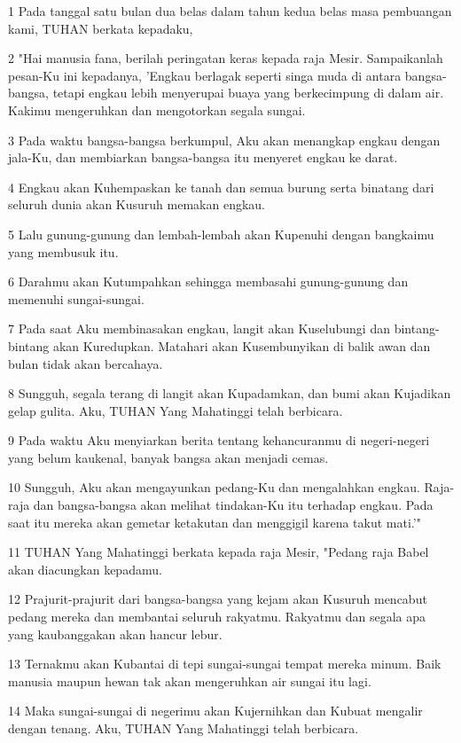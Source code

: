 \par 1 Pada tanggal satu bulan dua belas dalam tahun kedua belas masa pembuangan kami, TUHAN berkata kepadaku,
\par 2 "Hai manusia fana, berilah peringatan keras kepada raja Mesir. Sampaikanlah pesan-Ku ini kepadanya, 'Engkau berlagak seperti singa muda di antara bangsa-bangsa, tetapi engkau lebih menyerupai buaya yang berkecimpung di dalam air. Kakimu mengeruhkan dan mengotorkan segala sungai.
\par 3 Pada waktu bangsa-bangsa berkumpul, Aku akan menangkap engkau dengan jala-Ku, dan membiarkan bangsa-bangsa itu menyeret engkau ke darat.
\par 4 Engkau akan Kuhempaskan ke tanah dan semua burung serta binatang dari seluruh dunia akan Kusuruh memakan engkau.
\par 5 Lalu gunung-gunung dan lembah-lembah akan Kupenuhi dengan bangkaimu yang membusuk itu.
\par 6 Darahmu akan Kutumpahkan sehingga membasahi gunung-gunung dan memenuhi sungai-sungai.
\par 7 Pada saat Aku membinasakan engkau, langit akan Kuselubungi dan bintang-bintang akan Kuredupkan. Matahari akan Kusembunyikan di balik awan dan bulan tidak akan bercahaya.
\par 8 Sungguh, segala terang di langit akan Kupadamkan, dan bumi akan Kujadikan gelap gulita. Aku, TUHAN Yang Mahatinggi telah berbicara.
\par 9 Pada waktu Aku menyiarkan berita tentang kehancuranmu di negeri-negeri yang belum kaukenal, banyak bangsa akan menjadi cemas.
\par 10 Sungguh, Aku akan mengayunkan pedang-Ku dan mengalahkan engkau. Raja-raja dan bangsa-bangsa akan melihat tindakan-Ku itu terhadap engkau. Pada saat itu mereka akan gemetar ketakutan dan menggigil karena takut mati.'"
\par 11 TUHAN Yang Mahatinggi berkata kepada raja Mesir, "Pedang raja Babel akan diacungkan kepadamu.
\par 12 Prajurit-prajurit dari bangsa-bangsa yang kejam akan Kusuruh mencabut pedang mereka dan membantai seluruh rakyatmu. Rakyatmu dan segala apa yang kaubanggakan akan hancur lebur.
\par 13 Ternakmu akan Kubantai di tepi sungai-sungai tempat mereka minum. Baik manusia maupun hewan tak akan mengeruhkan air sungai itu lagi.
\par 14 Maka sungai-sungai di negerimu akan Kujernihkan dan Kubuat mengalir dengan tenang. Aku, TUHAN Yang Mahatinggi telah berbicara.
